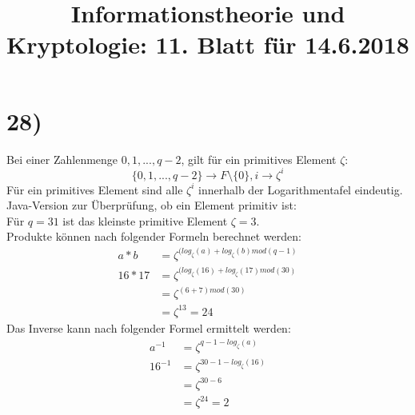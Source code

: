 %



  \title{Informationstheorie und Kryptologie: 11. Blatt für 14.6.2018}
  \maketitle

  \section*{28)}

    Bei einer Zahlenmenge ${0, 1, ..., q-2}$, gilt für ein primitives Element $\zeta$:
    \[ \{ 0, 1, ..., q-2 \} \to F \setminus \{ 0 \} , i \to \zeta^i \]
    Für ein primitives Element sind alle $\zeta^i$ innerhalb der Logarithmentafel eindeutig.\\
    Java-Version zur Überprüfung, ob ein Element primitiv ist:\\
    

    Für $q = 31$ ist das kleinste primitive Element $\zeta = 3$.\\
    Produkte können nach folgender Formeln berechnet werden:
    \begin{equation}
      \begin{split}
        a*b & = \zeta^{(log_\zeta(a)+log_\zeta(b) mod (q-1)} \\
        16*17 & = \zeta^{(log_\zeta(16)+log_\zeta(17) mod (30)} \\
        & = \zeta^{(6+7) mod (30)} \\
        & = \zeta^{13} = 24
      \end{split}
    \end{equation}
    Das Inverse kann nach folgender Formel ermittelt werden:
    \begin{equation}
      \begin{split}
        a^{-1} & = \zeta^{q-1-log_\zeta(a)} \\
        16^{-1} & = \zeta^{30-1-log_\zeta(16)} \\
        & = \zeta^{30-6} \\
        & = \zeta^{24} = 2
      \end{split}
    \end{equation}


